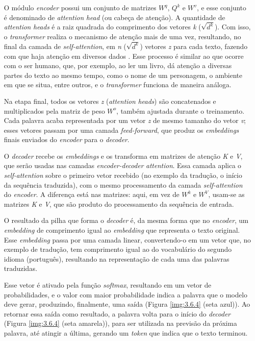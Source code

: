 O módulo \textit{encoder} possui um conjunto de matrizes $W^q$, $Q^k$ e $W^v$, e esse conjunto é denominado de \textit{attention head} (ou cabeça de atenção). A quantidade de \textit{attention heads} é a raiz quadrada do comprimento dos vetores \textit{k} ($\sqrt{d^k}$). Com isso, o \textit{transformer} realiza o mecanismo de atenção mais de uma vez, resultando, no final da camada de \textit{self-attention}, em \textit{n} ($\sqrt{d^k}$) vetores \textit{z} para cada texto, fazendo com que haja atenção em diversos dados \cite{popel2018}. Esse processo é similar ao que ocorre com o ser humano, que, por exemplo, ao ler um livro, dá atenção a diversas partes do texto ao mesmo tempo, como o nome de um personagem, o ambiente em que se situa, entre outros, e o \textit{transformer} funciona de maneira análoga.

Na etapa final, todos os vetores \textit{z} (\textit{attention heads}) são concatenados e multiplicados pela matriz de peso $W^o$, também ajustada durante o treinamento. Cada palavra acaba representada por um vetor \textit{z} de mesmo tamanho do vetor \textit{v}; esses vetores passam por uma camada \textit{feed-forward}, que produz os \textit{embeddings} finais enviados do \textit{encoder} para o \textit{decoder}.

O \textit{decoder} recebe os \textit{embeddings} e os transforma em matrizes de atenção \textit{K} e \textit{V}, que serão usadas nas camadas \textit{encoder-decoder attention}. Essa camada aplica o \textit{self-attention} sobre o primeiro vetor recebido (no exemplo da tradução, o início da sequência traduzida), com o mesmo processamento da camada \textit{self-attention} do \textit{encoder}. A diferença está nas matrizes: aqui, em vez de $W^k$ e $W^V$, usam-se as matrizes \textit{K} e \textit{V}, que são produto do processamento da sequência de entrada.

O resultado da pilha que forma o \textit{decoder} é, da mesma forma que no \textit{encoder}, um \textit{embedding} de comprimento igual ao \textit{embedding} que representa o texto original. Esse \textit{embedding} passa por uma camada linear, convertendo-o em um vetor que, no exemplo de tradução, tem comprimento igual ao do vocabulário do segundo idioma (português), resultando na representação de cada uma das palavras traduzidas.

Esse vetor é ativado pela função \textit{softmax}, resultando em um vetor de probabilidades, e o valor com maior probabilidade indica a palavra que o modelo deve gerar, produzindo, finalmente, uma saída (Figura \ref{img:3.6.4} (seta azul)). Ao retornar essa saída como resultado, a palavra volta para o início do \textit{decoder} (Figura \ref{img:3.6.4} (seta amarela)), para ser utilizada na previsão da próxima palavra, até atingir a última, gerando um \textit{token} que indica que o texto terminou.

